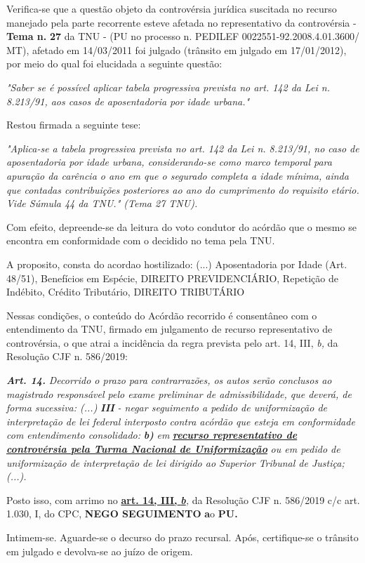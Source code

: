 \documentclass[12pt]{article}
\begin{document}
\justifying
\noindent Verifica-se que a questão objeto da controvérsia jurídica suscitada no recurso manejado pela parte recorrente esteve afetada no representativo da controvérsia - \textbf{Tema n. }\textbf{27} da TNU - (PU no processo n. PEDILEF 0022551-92.2008.4.01.3600/ MT),  afetado em 14/03/2011 foi julgado (trânsito em julgado em 17/01/2012), por meio do qual foi elucidada a seguinte questão:

\noindent \textit{"Saber se é possível aplicar tabela progressiva prevista no art. 142 da Lei n. 8.213/91, aos casos de aposentadoria por idade urbana."}

\noindent Restou firmada a seguinte tese:

\noindent \textit{"Aplica-se a tabela progressiva prevista no art. 142 da Lei n. 8.213/91, no caso de aposentadoria por idade urbana, considerando-se como marco temporal para apuração da carência o ano em que o segurado completa a idade mínima, ainda que contadas contribuições posteriores ao ano do cumprimento do requisito etário. Vide Súmula 44 da TNU." (Tema 27 TNU).}

\noindent Com efeito, depreende-se da leitura do voto condutor do acórdão que o mesmo se encontra em conformidade com o decidido no  tema pela TNU.

\noindent A proposito, consta do acordao hostilizado: (...) Aposentadoria por Idade (Art. 48/51), Benefícios em Espécie, DIREITO PREVIDENCIÁRIO, Repetição de Indébito, Crédito Tributário, DIREITO TRIBUTÁRIO

\noindent Nessas condições, o conteúdo do Acórdão recorrido é consentâneo com o entendimento da TNU, firmado em julgamento de recurso representativo de controvérsia, o que atrai a incidência da regra prevista pelo art. 14, III, \textit{b,} da Resolução CJF n. 586/2019:

\noindent \textit{\textbf{Art. 14.}}\textit{ Decorrido o prazo para contrarrazões, os autos serão conclusos ao magistrado responsável pelo exame preliminar de admissibilidade, que deverá, de forma sucessiva: (...) }\textit{\textbf{III }}\textit{- negar seguimento a pedido de uniformização de interpretação de lei federal interposto contra acórdão que esteja em conformidade com entendimento consolidado: }\textit{\textbf{b)}}\textit{ em }\uline{\textit{\textbf{recurso representativo de controvérsia pela Turma Nacional de Uniformização}}}\textit{ ou em pedido de uniformização de interpretação de lei dirigido ao Superior Tribunal de Justiça;(...).}

\noindent Posto isso, com arrimo no \uline{\textbf{art. 14, III, }}\uline{\textit{\textbf{b}}}\textit{,} da Resolução CJF n. 586/2019 c/c art. 1.030, I, do CPC, \textbf{NEGO SEGUIMENTO }\textbf{a}o\textbf{ PU}\textbf{.}

\noindent Intimem-se. Aguarde-se o decurso do prazo recursal. Após, certifique-se o trânsito em julgado e devolva-se ao juízo de origem.
\end{document}
